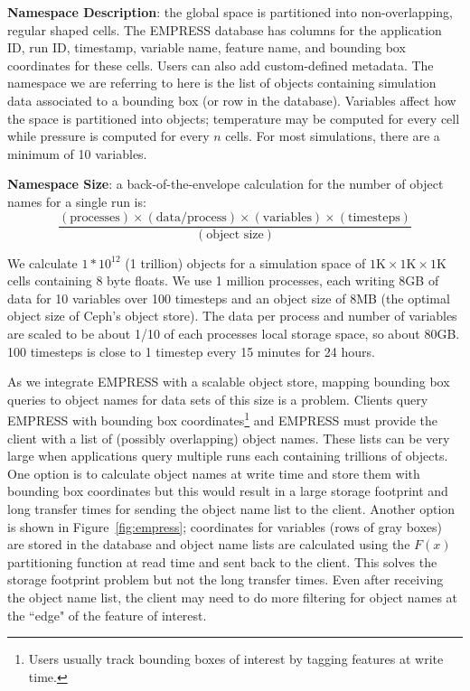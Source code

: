\textbf{Namespace Description}: the global space is partitioned into
non-overlapping, regular shaped cells.  The EMPRESS database has columns for
the application ID, run ID, timestamp, variable name, feature name, and
bounding box coordinates for these cells. Users can also add custom-defined
metadata.  The namespace we are referring to here is the list of objects
containing simulation data associated to a bounding box (or row in the
database).  Variables affect how the space is partitioned into objects;
temperature may be computed for every cell while pressure is computed for every
\(n\) cells. For most simulations, there are a minimum of 10 variables. 

\textbf{Namespace Size}: a back-of-the-envelope calculation for the number of
object names for a single run is:
\vspace{-0.75em}
\[\frac
  {(\text{processes})\times
   (\text{data/process})\times
   (\text{variables})\times
   (\text{timesteps})}
  {(\text{object size})}
\]
\vspace{-0.75em}

We calculate \(1*10^{12}\) (1 trillion) objects for a simulation space of
\(1\text{K}\times1\text{K}\times1\text{K}\) cells containing 8 byte floats.  We
use 1 million processes, each writing 8GB of data for 10 variables over 100
timesteps and an object size of 8MB (the optimal object size of Ceph's object
store).  The data per process and number of variables are scaled to be about
1/10 of each processes local storage space, so about 80GB. 100 timesteps is
close to 1 timestep every 15 minutes for 24 hours. 

As we integrate EMPRESS with a scalable object store, mapping bounding box
queries to object names for data sets of this size is a problem. Clients query
EMPRESS with bounding box coordinates\footnote{Users usually track bounding
boxes of interest by tagging features at write time.} and EMPRESS must provide
the client with a list of (possibly overlapping) object names.  These lists can
be very large when applications query multiple runs each containing trillions
of objects.  One option is to calculate object names at write time and store
them with bounding box coordinates but this would result in a large storage
footprint and long transfer times for sending the object name list to the
client.  Another option is shown in Figure~\ref{fig:empress}; coordinates for
variables (rows of gray boxes) are stored in the database and object name lists
are calculated using the \(F(x)\) partitioning function at read time and sent
back to the client. This solves the storage footprint problem but not the long
transfer times.  Even after receiving the object name list, the client may need
to do more filtering for object names at the ``edge" of the feature of
interest.

